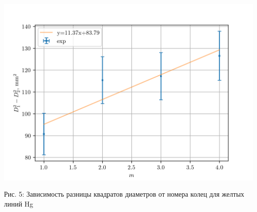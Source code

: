 \documentclass[12pt]{article}
\begin{document}
    \begin{minipage}{0.3\linewidth}
        \includegraphics[width=\linewidth]{pic/Hg_yellow(1)}
        \label{fig:fig5}
        \caption{Рис. 5: Зависимость разницы квадратов диаметров от номера колец для желтых линий Hg}
    \end{minipage}
\end{document}
